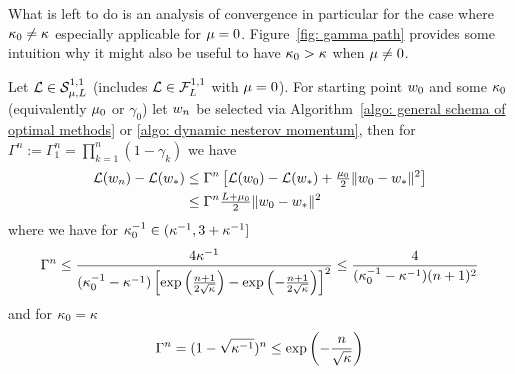 What is left to do is an analysis of convergence in particular for the case
where \(\kappa_0\neq\kappa\) especially applicable for \(\mu=0\).
Figure~\ref{fig: gamma path} provides some intuition why it might also be
useful to have \(\kappa_0>\kappa\) when \(\mu\neq0\).

\begin{theorem}\label{thm: nesterov momentum convergence rates}
	Let \(\mathcal{L} \in \mathcal{S}^{1,1}_{{\mu},{L}}\) (includes
	\(\mathcal{L}\in\mathcal{F}^{1,1}_{L}\) with \(\mu=0\)). For starting point
	\(w_0\) and some \(\kappa_0\) (equivalently \(\mu_0\) or
	\(\gamma_0\)) let \(w_n\) be selected via Algorithm~\ref{algo: general schema of optimal methods}
	or \ref{algo: dynamic nesterov momentum}, then for \(\Gamma^n := \Gamma_1^n =
	\prod_{k=1}^n(1-\gamma_k)\) we have
	\begin{align*}
		\mathcal{L}(w_n) - \mathcal{L}(w_*)
		&\le \Gamma^n\left[
			\mathcal{L}(w_0) -\mathcal{L}(w_*)
			+ \tfrac{\mu_0}2\|w_0-w_*\|^2
		\right] \\
		&\le \Gamma^n \tfrac{L + \mu_0}{2}\|w_0-w_*\|^2
	\end{align*}
	where we have for \(\kappa_0^{-1}\in (\kappa^{-1}, 3 + \kappa^{-1}]\)
	\begin{align*}
		\Gamma^n
		\le \frac{4\kappa^{-1}}{(\kappa_0^{-1}-\kappa^{-1})\left[
			\exp\left(\frac{n+1}{2\sqrt{\kappa}}\right)
			-\exp\left(-\frac{n+1}{2\sqrt{\kappa}}\right)
		\right]^2}
		\le \frac{4}{(\kappa_0^{-1}-\kappa^{-1})(n+1)^2}
	\end{align*}
	and for \(\kappa_0 = \kappa\)
	\begin{align*}
		\Gamma^n = (1-\sqrt{\kappa^{-1}})^n
		\le \exp\left(-\frac{n}{\sqrt{\kappa}}\right)
	\end{align*}
\end{theorem}
